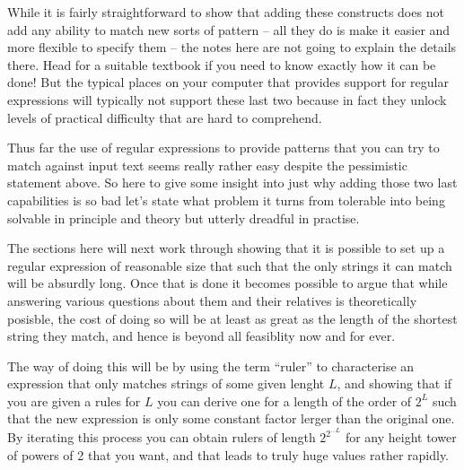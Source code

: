 While it is fairly straightforward to show that adding these constructs does
not add any ability to match new sorts of pattern -- all they do is
make it easier and more flexible to specify them -- the notes here are
not going to explain the details there. Head for a suitable textbook if you
need to know exactly how it can be done! But the typical places on
your computer that provides support for regular expressions will typically not
support these last two because in fact they unlock levels of practical
difficulty that are hard to comprehend.

Thus far the use of regular expressions to provide patterns that you can
try to match against input text seems really rather easy despite the
pessimistic statement above. So here to give some insight into just
why adding those two last capabilities is so bad let's state what
problem it turns from tolerable into being solvable in principle and
theory but utterly dreadful in practise.

The sections here will next work through showing that it is possible to
set up a regular expression of reasonable size that such that the
only strings it can match will be absurdly long. Once that is done
it becomes possible to argue that while answering various questions
about them and their relatives is theoretically posisble, the cost of
doing so will be at least as great as the length of the shortest string
they match, and hence is beyond all feasiblity now and for ever.

The way of doing this will be by using the term ``ruler'' to characterise
an expression that only matches strings of some given lenght $L$, and
showing that if you are given a rules for $L$ you can derive one for
a length of the order of $2^{L}$ such that the new expression is only
some constant factor lerger than the original one. By iterating this
process you can obtain rulers of length $2^{2^{\ldots L}}$ for any height
tower of powers of 2 that you want, and that leads to truly huge values
rather rapidly.

